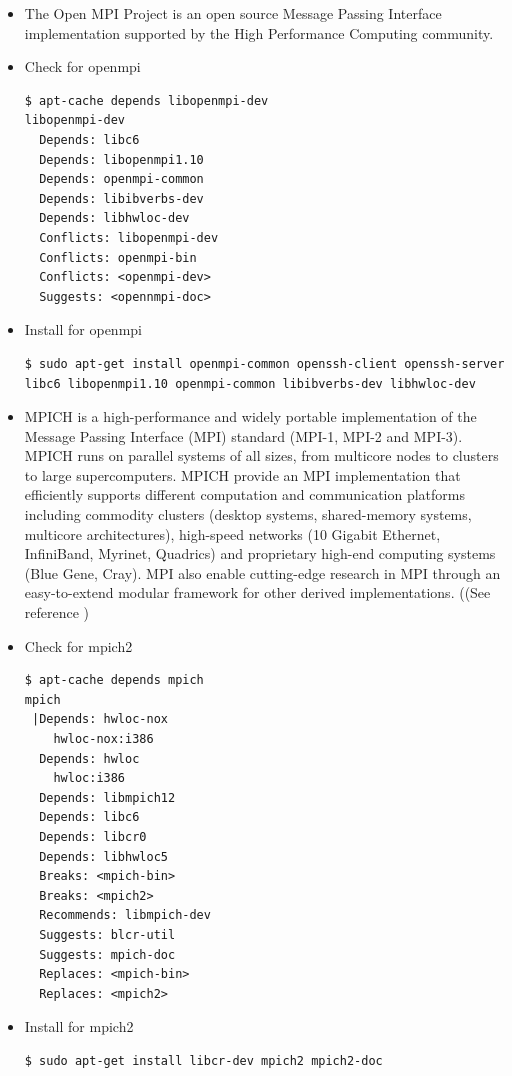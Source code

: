 \documentclass{article}
\begin{document}
\begin{itemize}
\item The Open MPI Project is an open source Message Passing Interface implementation supported by the High Performance Computing community. 
\item Check for openmpi
\scriptsize
\begin{verbatim}
$ apt-cache depends libopenmpi-dev
libopenmpi-dev
  Depends: libc6
  Depends: libopenmpi1.10
  Depends: openmpi-common
  Depends: libibverbs-dev
  Depends: libhwloc-dev
  Conflicts: libopenmpi-dev
  Conflicts: openmpi-bin
  Conflicts: <openmpi-dev>
  Suggests: <opennmpi-doc>
\end{verbatim}
\normalsize
\item Install for openmpi
\scriptsize
\begin{verbatim}  
$ sudo apt-get install openmpi-common openssh-client openssh-server libc6 libopenmpi1.10 openmpi-common libibverbs-dev libhwloc-dev
\end{verbatim}
\normalsize
\item MPICH is a high-performance and widely portable implementation of the Message Passing Interface (MPI) standard (MPI-1, MPI-2 and MPI-3). 
MPICH runs on parallel systems of all sizes, from multicore nodes to clusters to large supercomputers. 
MPICH provide an MPI implementation that efficiently supports different computation and communication platforms including commodity clusters
(desktop systems, shared-memory systems, multicore architectures), high-speed networks (10 Gigabit Ethernet, InfiniBand, Myrinet, Quadrics) and proprietary high-end computing systems
(Blue Gene, Cray). MPI also enable cutting-edge research in MPI through an easy-to-extend modular framework for other derived implementations. ((See reference \cite{overview_mpich})
\item Check for mpich2
\scriptsize
\begin{verbatim}
$ apt-cache depends mpich
mpich
 |Depends: hwloc-nox
    hwloc-nox:i386
  Depends: hwloc
    hwloc:i386
  Depends: libmpich12
  Depends: libc6
  Depends: libcr0
  Depends: libhwloc5
  Breaks: <mpich-bin>
  Breaks: <mpich2>
  Recommends: libmpich-dev
  Suggests: blcr-util
  Suggests: mpich-doc
  Replaces: <mpich-bin>
  Replaces: <mpich2>
\end{verbatim}
\normalsize
\item Install for mpich2
\scriptsize
\begin{verbatim}  
$ sudo apt-get install libcr-dev mpich2 mpich2-doc
\end{verbatim}
\normalsize


\end{itemize}
\end{document}
